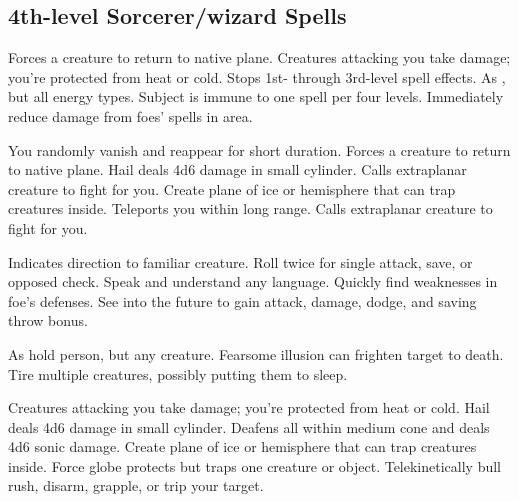 \subsection{4th-level Sorcerer/wizard Spells} 
\begin{swspelllist}
 Forces a creature to return to native plane.
 Creatures attacking you take damage; you're protected from heat or cold.
 Stops 1st- through 3rd-level spell effects.
 As , but all energy types.
 Subject is immune to one spell per four levels.
 Immediately reduce damage from foes' spells in area.
\spellheadrestricted{}

 You randomly vanish and reappear for short duration.
 Forces a creature to return to native plane.
 Hail deals 4d6 damage in small cylinder.
 Calls extraplanar creature to fight for you.
 Create plane of ice or hemisphere that can trap creatures inside.
 Teleports you within long range.
 Calls extraplanar creature to fight for you.

 Indicates direction to familiar creature.
 Roll twice for single attack, save, or opposed check.
 Speak and understand any language.
 Quickly find weaknesses in foe's defenses.
 See into the future to gain attack, damage, dodge, and saving throw bonus.

 As hold person, but any creature.
 Fearsome illusion can frighten target to death.
 Tire multiple creatures, possibly putting them to sleep.
\spellheadrestricted{}
\spellheadrestricted{}

 Creatures attacking you take damage; you're protected from heat or cold.
 Hail deals 4d6 damage in small cylinder.
 Deafens all within medium cone and deals 4d6 sonic damage.
 Create plane of ice or hemisphere that can trap creatures inside.
 Force globe protects but traps one creature or object.
 Telekinetically bull rush, disarm, grapple, or trip your target.


\end{swspelllist}
